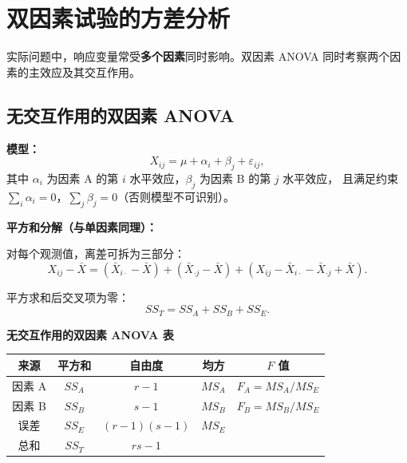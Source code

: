 \section{双因素试验的方差分析}

实际问题中，响应变量常受\textbf{多个因素}同时影响。双因素 ANOVA 同时考察两个因素的主效应及其交互作用。

\subsection{无交互作用的双因素 ANOVA}

\textbf{模型：}
\begin{equation}
    X_{ij} = \mu + \alpha_i + \beta_j + \varepsilon_{ij},
\end{equation}
其中 $\alpha_i$ 为因素 A 的第 $i$ 水平效应，$\beta_j$ 为因素 B 的第 $j$ 水平效应，
且满足约束 $\sum_{i}\alpha_i = 0$，$\sum_{j}\beta_j = 0$（否则模型不可识别）。

\textbf{平方和分解（与单因素同理）：}

对每个观测值，离差可拆为三部分：
\begin{equation}
    \boxed{X_{ij} - \bar{X} = (\bar{X}_{i\cdot} - \bar{X}) + (\bar{X}_{\cdot j} - \bar{X}) + (X_{ij} - \bar{X}_{i\cdot} - \bar{X}_{\cdot j} + \bar{X})}.
\end{equation}

平方求和后交叉项为零：
\begin{equation}
    \boxed{SS_T = SS_A + SS_B + SS_E}.
\end{equation}

\begin{center}
\textbf{无交互作用的双因素 ANOVA 表}
\begin{tabular}{c|c|c|c|c}
    \toprule
    来源 & 平方和 & 自由度 & 均方 & $F$ 值 \\
    \midrule
    因素 A & $SS_A$ & $r-1$ & $MS_A$ & $F_A = MS_A / MS_E$ \\
    因素 B & $SS_B$ & $s-1$ & $MS_B$ & $F_B = MS_B / MS_E$ \\
    误差   & $SS_E$ & $(r-1)(s-1)$ & $MS_E$ & \\
    \midrule
    总和   & $SS_T$ & $rs-1$ & & \\
    \bottomrule
\end{tabular}
\end{center}


